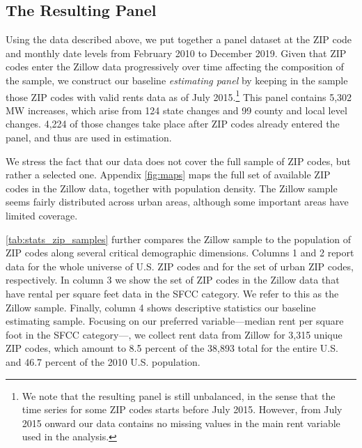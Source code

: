
\subsection{The Resulting Panel}\label{sec:data_final_panel}

Using the data described above, we put together a panel dataset at the ZIP code and monthly 
date levels from February 2010 to December 2019. Given that ZIP codes enter the Zillow data 
progressively over time affecting the composition of the sample, we construct our baseline 
\textit{estimating panel} by keeping in the sample those ZIP codes with valid rents data as 
of July 2015.\footnote{We note that the resulting panel is still unbalanced, in the sense 
	that the time series for some ZIP codes starts before July 2015. However, from July
	2015 onward our data contains no missing values in the main rent variable used in the 
	analysis.} 
This panel contains 5,302 MW increases, which arise from 124 state changes and 99 county 
and local level changes. 4,224 of those changes take place after ZIP codes already entered
the panel, and thus are used in estimation.

We stress the fact that our data does not cover the full sample of ZIP codes, but rather 
a selected one. Appendix \autoref{fig:maps} maps the full set of available ZIP codes in 
the Zillow data, together with population density. The Zillow sample seems fairly 
distributed across urban areas, although some important areas have limited coverage. 


\autoref{tab:stats_zip_samples} further compares the Zillow sample to the 
population of ZIP codes along several critical demographic dimensions. Columns 1 
and 2 report data for the whole universe of U.S. ZIP codes and for the set of urban ZIP 
codes, respectively. In column 3 we show the set of ZIP codes in the Zillow data that have 
rental per square feet data in the SFCC category. We refer to this as the Zillow sample. 
Finally, column 4 shows descriptive statistics our baseline estimating sample. Focusing on 
our preferred variable---median rent per square foot in the SFCC category---, we collect rent 
data from Zillow for 3,315 unique ZIP codes, which amount to 8.5 percent of the 38,893 total 
for the entire U.S. and 46.7 percent of the 2010 U.S. population. 

